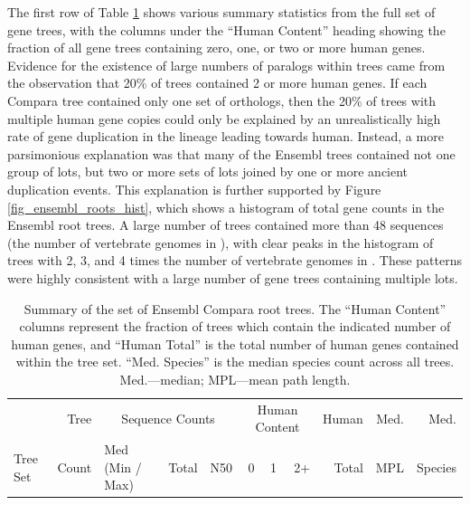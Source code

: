 The first row of Table \ref{table_ensembl_roots} shows various summary
statistics from the full set of \cmp gene trees, with the columns
under the ``Human Content'' heading showing the fraction of all gene
trees containing zero, one, or two or more human genes. Evidence for
the existence of large numbers of paralogs within \cmp trees came from
the observation that 20\% of \cmp trees contained 2 or more human
genes. If each Compara tree contained only one set of \mammln
orthologs, then the 20\% of trees with multiple human gene copies
could only be explained by an unrealistically high rate of gene
duplication in the lineage leading towards human. Instead, a more
parsimonious explanation was that many of the Ensembl trees contained
not one group of \mammln \acp{lot}, but two or more sets of \mammln
\acp{lot} joined by one or more ancient duplication events. This
explanation is further supported by Figure
\ref{fig_ensembl_roots_hist}, which shows a histogram of total gene
counts in the Ensembl root trees. A large number of trees contained
more than 48 sequences (the number of vertebrate genomes in \ens),
with clear peaks in the histogram of trees with 2, 3, and 4 times the
number of vertebrate genomes in \ens. These patterns were highly
consistent with a large number of \cmp gene trees containing multiple
\mammln \acp{lot}.

\begin{table}
\scriptsize \centering
\begin{tabular}{lrb{2cm}rrrrrrrr}
\toprule
 & Tree &  \multicolumn{3}{c}{Sequence Counts} & \multicolumn{3}{c}{Human Content} & Human & Med. & Med. \\ \cmidrule(r){3-5} \cmidrule(r){6-8}
Tree Set & Count  & \tiny{Med (Min / Max)} & Total & N50 & 0 & 1 & 2+ & Total & MPL & Species \\ 
  \midrule

   \bottomrule
\end{tabular}
\caption{Summary of the set of Ensembl Compara root trees. The ``Human
  Content'' columns represent the fraction of trees which contain the
  indicated number of human genes, and ``Human Total'' is the total
  number of human genes contained within the tree set. ``Med. Species''
  is the median species count across all trees. Med.---median;
  MPL---mean path length.}
\label{table_ensembl_roots}
\end{table}

